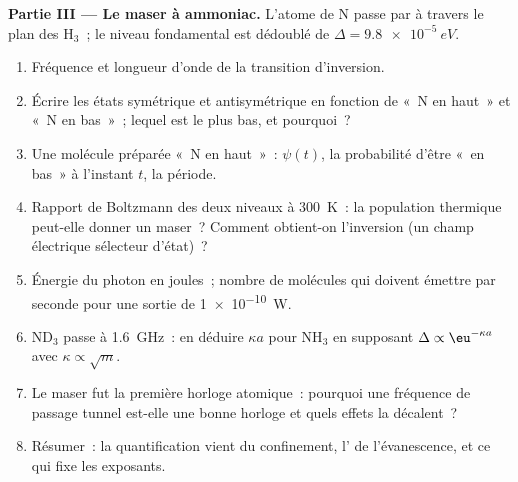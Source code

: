 \begin{problem}
\textbf{Partie III --- Le maser à ammoniac.}
L'atome de N passe par  à travers le plan des H$_3$~; le niveau fondamental est dédoublé
de $\Delta = \qty{9.8e-5}{eV}$.
\begin{enumerate}[resume]
  \item Fréquence et longueur d'onde de la transition d'inversion.
  \item Écrire les états symétrique et antisymétrique en fonction de
        «~N en haut~» et «~N en bas~»~; lequel est le plus bas, et pourquoi~?
  \item Une molécule préparée «~N en haut~»~: $\psi(t)$, la probabilité d'être
        «~en bas~» à l'instant $t$, la période.
  \item Rapport de Boltzmann des deux niveaux à \qty{300}{K}~: la
        population thermique peut-elle donner un maser~? Comment obtient-on l'inversion
        (un champ électrique sélecteur d'état)~?
  \item Énergie du photon en joules~; nombre de molécules qui doivent émettre
        par seconde pour une sortie de \qty{1e-10}{W}.
  \item ND$_3$ passe à \qty{1.6}{GHz}~: en déduire $\kappa a$ pour NH$_3$
        en supposant $\Delta \propto \eu^{-\kappa a}$ avec $\kappa \propto \sqrt{m}$.
  \item Le maser fut la première horloge atomique~: pourquoi une fréquence de
        passage tunnel est-elle une bonne horloge et quels effets la décalent~?
  \item Résumer~: la quantification vient du confinement, l' de
        l'évanescence, et ce qui fixe les exposants.
\end{enumerate}
\end{problem}
